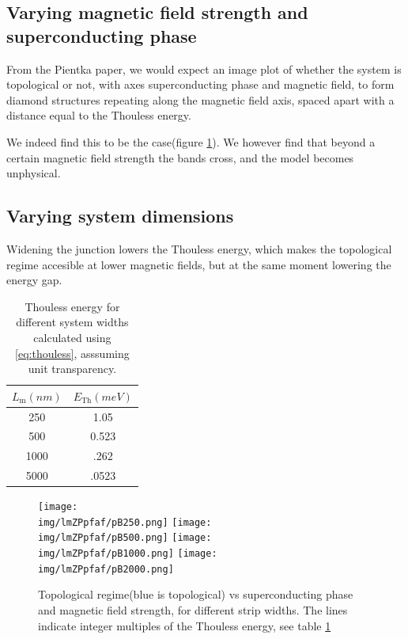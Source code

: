\documentclass[10pt,a4paper]{article}
\newcommand{\img}{./images}
\begin{document}
	\subsection{Varying magnetic field strength and superconducting phase}
		From the Pientka paper, we would expect an image plot of whether the system is topological or not, with axes superconducting phase and magnetic field, to form diamond structures repeating along the magnetic field axis, spaced apart with a distance equal to the Thouless energy.
		
		We indeed find this to be the case(figure \ref{fig:lmZPpfaf}). We however find that beyond a certain magnetic field strength the bands cross, and the model becomes unphysical.
	\subsection{Varying system dimensions}
	Widening the junction lowers the Thouless energy, which makes the topological regime accesible at lower magnetic fields, but at the same moment lowering the energy gap.
	\begin{table}[H]
		\centering
		\begin{tabular}{|c|c|}
			\hline 
			$L_\text{m} (nm)$ & $E_\text{Th} (meV)$ \\ 
			\hline 
			250 & 1.05 \\ 
			\hline 
			500 & 0.523 \\ 
			\hline 
			1000 & .262 \\ 
			\hline 
			5000 & .0523 \\ 
			\hline 
		\end{tabular} 
		\caption{Thouless energy for different system widths calculated using \ref{eq:thouless}, asssuming unit transparency.}
		\label{table:thouless}
	\end{table}
	
	\begin{figure}[H]
		\texttt{[image: \\img/lmZPpfaf/pB250.png]}
		\texttt{[image: \\img/lmZPpfaf/pB500.png]}
		\texttt{[image: \\img/lmZPpfaf/pB1000.png]}
		\texttt{[image: \\img/lmZPpfaf/pB2000.png]}
		\caption{Topological regime(blue is topological) vs superconducting phase and magnetic field strength, for different strip widths. The lines indicate integer multiples of the Thouless energy, see table \ref{table:thouless}}
		\label{fig:lmZPpfaf}
	\end{figure}
	
\end{document}
